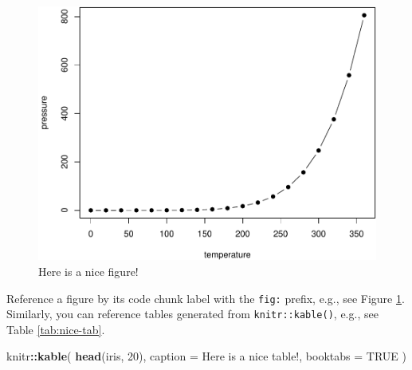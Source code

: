 \documentclass[
]{book}
\newenvironment{Shaded}{\begin{snugshade}}{\end{snugshade}}
\newcommand{\AttributeTok}[1]{\textcolor[rgb]{0.13,0.29,0.53}{#1}}
\newcommand{\ConstantTok}[1]{\textcolor[rgb]{0.56,0.35,0.01}{#1}}
\newcommand{\DecValTok}[1]{\textcolor[rgb]{0.00,0.00,0.81}{#1}}
\newcommand{\FunctionTok}[1]{\textcolor[rgb]{0.13,0.29,0.53}{\textbf{#1}}}
\newcommand{\NormalTok}[1]{#1}
\newcommand{\SpecialCharTok}[1]{\textcolor[rgb]{0.81,0.36,0.00}{\textbf{#1}}}
\newcommand{\StringTok}[1]{\textcolor[rgb]{0.31,0.60,0.02}{#1}}
\theoremstyle{definition}
\theoremstyle{definition}
\theoremstyle{definition}
\theoremstyle{definition}
\theoremstyle{remark}
\begin{document}
\begin{figure}

{\centering \includegraphics[width=0.8\linewidth]{bookdown-demo_files/figure-latex/nice-fig-1} 

}

\caption{Here is a nice figure!}\label{fig:nice-fig}
\end{figure}

Reference a figure by its code chunk label with the \texttt{fig:} prefix, e.g., see Figure \ref{fig:nice-fig}. Similarly, you can reference tables generated from \texttt{knitr::kable()}, e.g., see Table \ref{tab:nice-tab}.

\begin{Shaded}
\begin{Highlighting}[]
\NormalTok{knitr}\SpecialCharTok{::}\FunctionTok{kable}\NormalTok{(}
  \FunctionTok{head}\NormalTok{(iris, }\DecValTok{20}\NormalTok{), }\AttributeTok{caption =} \StringTok{\textquotesingle{}Here is a nice table!\textquotesingle{}}\NormalTok{,}
  \AttributeTok{booktabs =} \ConstantTok{TRUE}
\NormalTok{)}
\end{Highlighting}
\end{Shaded}
\end{document}

